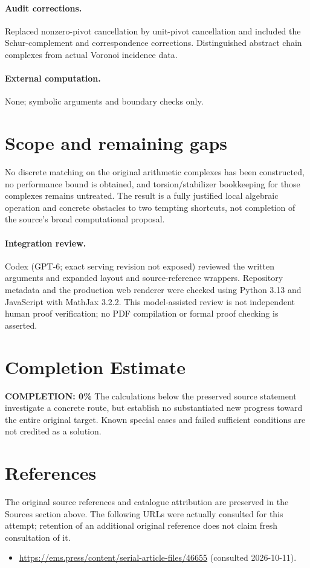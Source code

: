 \documentclass[11pt]{article}
\begin{document}
\paragraph{Audit corrections.} Replaced nonzero-pivot cancellation by unit-pivot cancellation and included the Schur-complement and correspondence corrections. Distinguished abstract chain complexes from actual Voronoi incidence data.
\paragraph{External computation.} None; symbolic arguments and boundary checks only.
\section{Scope and remaining gaps}
No discrete matching on the original arithmetic complexes has been constructed, no performance bound is obtained, and torsion/stabilizer bookkeeping for those complexes remains untreated. The result is a fully justified local algebraic operation and concrete obstacles to two tempting shortcuts, not completion of the source's broad computational proposal.
\paragraph{Integration review.} Codex (GPT-6; exact serving revision not exposed) reviewed the written arguments and expanded layout and source-reference wrappers. Repository metadata and the production web renderer were checked using Python 3.13 and JavaScript with MathJax 3.2.2. This model-assisted review is not independent human proof verification; no PDF compilation or formal proof checking is asserted.

\section{Completion Estimate}
\noindent\textbf{COMPLETION: 0\%}
The calculations below the preserved source statement investigate a concrete route,
but establish no substantiated new progress toward the entire original target.
Known special cases and failed sufficient conditions are not credited as a solution.
\section{References}
The original source references and catalogue attribution are preserved in the
Sources section above. The following URLs were actually consulted for this attempt;
retention of an additional original reference does not claim fresh consultation of it.
\begin{itemize}
\item \url{https://ems.press/content/serial-article-files/46655} (consulted 2026-10-11). 
\end{itemize}
\end{document}
